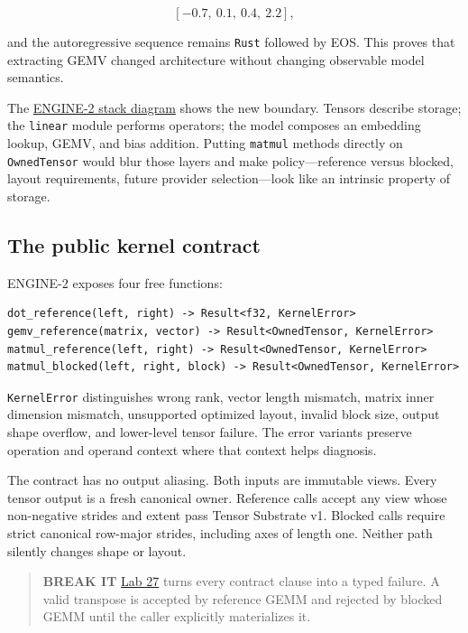 \documentclass[
  10pt,
]{article}
\begin{document}
\[
[-0.7,\ 0.1,\ 0.4,\ 2.2],
\]

and the autoregressive sequence remains \texttt{Rust} followed by EOS.
This proves that extracting GEMV changed architecture without changing
observable model semantics.

The
\href{https://github.com/hermonai/inside-the-llm-engine/blob/astra-visual-rewrite/diagrams/linear/engine-2-kernel-stack.txt}{ENGINE-2
stack diagram} shows the new boundary. Tensors describe storage; the
\texttt{linear} module performs operators; the model composes an
embedding lookup, GEMV, and bias addition. Putting \texttt{matmul}
methods directly on \texttt{OwnedTensor} would blur those layers and
make policy---reference versus blocked, layout requirements, future
provider selection---look like an intrinsic property of storage.

\subsection{The public kernel
contract}\label{the-public-kernel-contract}

ENGINE-2 exposes four free functions:

\begin{verbatim}
dot_reference(left, right) -> Result<f32, KernelError>
gemv_reference(matrix, vector) -> Result<OwnedTensor, KernelError>
matmul_reference(left, right) -> Result<OwnedTensor, KernelError>
matmul_blocked(left, right, block) -> Result<OwnedTensor, KernelError>
\end{verbatim}

\texttt{KernelError} distinguishes wrong rank, vector length mismatch,
matrix inner dimension mismatch, unsupported optimized layout, invalid
block size, output shape overflow, and lower-level tensor failure. The
error variants preserve operation and operand context where that context
helps diagnosis.

The contract has no output aliasing. Both inputs are immutable views.
Every tensor output is a fresh canonical owner. Reference calls accept
any view whose non-negative strides and extent pass Tensor Substrate v1.
Blocked calls require strict canonical row-major strides, including axes
of length one. Neither path silently changes shape or layout.

\begin{quote}
\textbf{BREAK IT}
\href{https://github.com/hermonai/inside-the-llm-engine/blob/astra-visual-rewrite/labs/lab-27-break-the-kernel.md}{Lab
27} turns every contract clause into a typed failure. A valid transpose
is accepted by reference GEMM and rejected by blocked GEMM until the
caller explicitly materializes it.
\end{quote}
\end{document}
